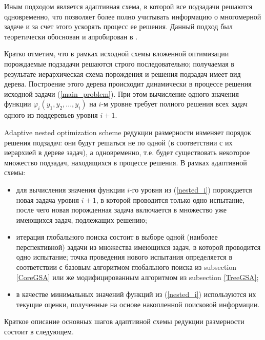 \documentclass[entropy,article,submit,moreauthors,pdftex]{Definitions/mdpi}
\begin{document}
Иным  подходом является адаптивная схема, в которой все подзадачи решаются одновременно, что позволяет более полно учитывать информацию о многомерной задаче и за счет этого ускорять процесс ее решения.
Данный подход был теоретически обоснован и апробирован в \cite{Grishagin2016,Grishagin2016_1,Grishagin2018}. 

Кратко отметим, что в рамках исходной схемы вложенной оптимизации порождаемые подзадачи решаются строго последовательно; получаемая в результате иерархическая схема порождения и решения подзадач имеет вид дерева. Построение этого дерева происходит динамически в процессе решения исходной задачи (\ref{main_problem}). При этом вычисление одного значения функции $\varphi_i(y_1,y_2,...,y_i)$ на $i$-м уровне требует полного решения всех задач одного из поддеревьев уровня $i+1$.

Adaptive nested optimization scheme  редукции размерности изменяет порядок решения подзадач: они будут решаться не по одной (в соответствии с их иерархией в дереве задач), а одновременно, т.е. будет существовать некоторое множество подзадач, находящихся в процессе решения. В рамках адаптивной схемы:
\begin{itemize}
	\item 
для вычисления значения функции $i$-го уровня из (\ref{nested_i}) порождается новая задача уровня $i+1$, в которой проводится только одно испытание, после чего новая порожденная задача включается в множество уже имеющихся задач, подлежащих решению;
	\item 
	итерация глобального поиска состоит в выборе одной (наиболее перспективной) задачи из множества имеющихся задач, в которой проводится одно испытание; точка проведения нового испытания определяется в соответствии с базовым алгоритмом глобального поиска из subsection \ref{CoreGSA} или же модифицированным алгоритмом из subsection \ref{TreeGSA};
	\item
в качестве минимальных значений функций из (\ref{nested_i}) используются их текущие оценки, полученные на основе накопленной поисковой информации.
\end{itemize}

Краткое описание основных шагов адаптивной схемы редукции размерности состоит в следующем.
\end{document}
